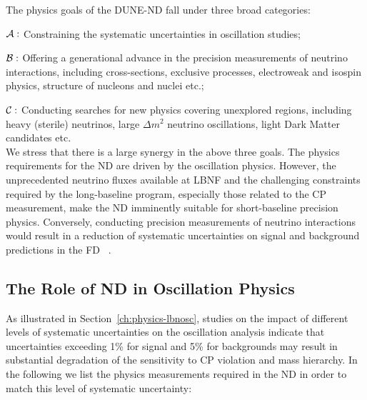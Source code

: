 The physics goals of the DUNE-ND fall under three broad categories: 

\noindent
{\boldmath $ {\cal A:}$} Constraining the systematic uncertainties in  oscillation studies;  

\noindent
{\boldmath $ {\cal B:}$} Offering a generational advance in the precision measurements of neutrino interactions, including 
cross-sections, exclusive processes, electroweak and isospin physics, structure of nucleons and nuclei etc.;  

\noindent
{\boldmath $ {\cal C:}$} Conducting searches for new physics covering unexplored regions, 
including heavy (sterile) neutrinos, large $\Delta m^2$ neutrino oscillations, light Dark Matter 
candidates etc. \\
\noindent
We stress that there is a large synergy in the above three goals. The physics requirements for the ND are driven 
by the oscillation physics. However,  the unprecedented neutrino fluxes available at LBNF and the challenging 
constraints required by the long-baseline program, especially those related to the CP measurement,   make the ND imminently suitable for  short-baseline 
precision physics. Conversely, conducting precision measurements of neutrino 
interactions would result in a reduction of systematic uncertainties on signal and background 
predictions in the FD ~\cite{DPR, LBNE-SCI}. 



\subsection{The Role of ND in Oscillation Physics}  
\label{sec-nd-oscl} 

As illustrated in Section~\ref{ch:physics-lbnosc}, studies on the impact of different levels of systematic 
uncertainties on the oscillation analysis indicate 
that uncertainties exceeding 1\% for signal and 5\% for backgrounds may result in 
substantial degradation of the sensitivity to CP violation and mass hierarchy. 
In the following we list the physics measurements required in the ND in order to 
match this level of systematic uncertainty:   

